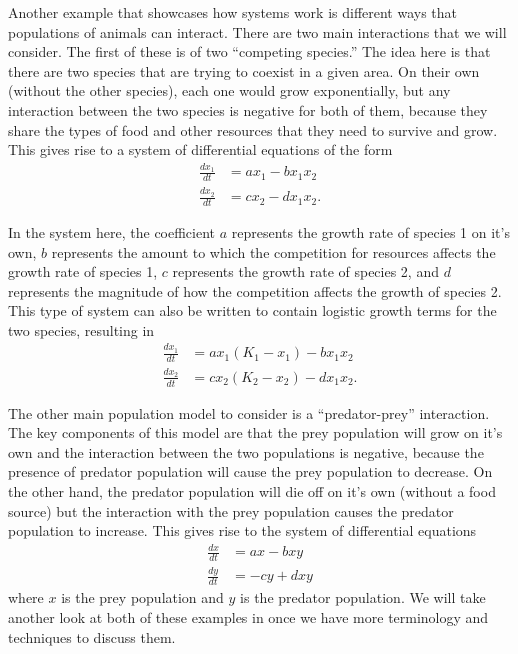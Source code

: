 \begin{example} \label{sintro:pop-example}
Another example that showcases how systems work is different ways that populations of animals can interact. There are two main interactions that we will consider. The first of these is of two ``competing species.'' The idea here is that there are two species that are trying to coexist in a given area. On their own (without the other species), each one would grow exponentially, but any interaction between the two species is negative for both of them, because they share the types of food and other resources that they need to survive and grow. This gives rise to a system of differential equations of the form
\[ \begin{split}
\frac{dx_1}{dt} &= ax_1 - bx_1x_2 \\
\frac{dx_2}{dt} &= cx_2 - dx_1x_2.
\end{split} \]

In the system here, the coefficient $a$ represents the growth rate of species 1 on it's own, $b$ represents the amount to which the competition for resources affects the growth rate of species 1, $c$ represents the growth rate of species 2, and $d$ represents the magnitude of how the competition affects the growth of species 2. This type of system can also be written to contain logistic growth terms for the two species, resulting in 
\[ \begin{split}
\frac{dx_1}{dt} &= ax_1(K_1 - x_1) - bx_1x_2 \\
\frac{dx_2}{dt} &= cx_2(K_2 - x_2) - dx_1x_2.
\end{split} \]

The other main population model to consider is a ``predator-prey'' interaction. The key components of this model are that the prey population will grow on it's own and the interaction between the two populations is negative, because the presence of predator population will cause the prey population to decrease. On the other hand, the predator population will die off on it's own (without a food source) but the interaction with the prey population causes the predator population to increase. This gives rise to the system of differential equations
\[
\begin{split}
\frac{dx}{dt} &= ax - bxy \\
\frac{dy}{dt} &= -cy + dxy
\end{split}
\]
where $x$ is the prey population and $y$ is the predator population. We will take another look at both of these examples in  once we have more terminology and techniques to discuss them.
\end{example}

